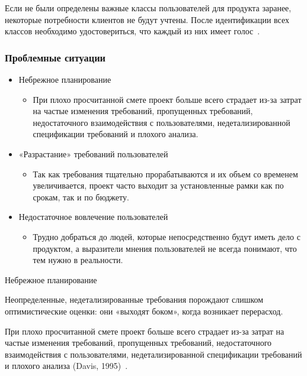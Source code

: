 \documentclass{../industrial-development}
\begin{document}
{Если не были определены важные классы пользователей для продукта заранее, некоторые потребности клиентов не будут учтены.
После идентификации всех классов необходимо удостовериться, что каждый из них имеет голос~\cite[с.~19]{Wiegers}.


\begin{frame} \frametitle {Проблемные ситуации}
\begin{itemize}

\item \alert{Небрежное планирование} 
\begin{itemize}
\item При плохо просчитанной смете проект больше всего страдает из-за затрат на частые изменения требований, пропущенных требований, недостаточного взаимодействия с пользователями, недетализированной спецификации требований и плохого
анализа.
\end{itemize}

\item \alert{«Разрастание» требований пользователей}
\begin{itemize}
\item Так как требования тщательно прорабатываются и их объем со временем увеличивается, проект часто выходит за установленные рамки как по срокам, так и по бюджету. 
\end{itemize}

\item \alert{Недостаточное вовлечение пользователей}
\begin{itemize}
\item  Трудно добраться до
людей, которые непосредственно будут иметь дело с продуктом, а выразители мнения пользователей не всегда понимают, что тем нужно в реальности. 
\end{itemize}

\end{itemize}
\end{frame}

\lecturenotes

\alert{Небрежное планирование}

Неопределенные, недетализированные требования порождают слишком оптимистические оценки: они «выходят боком», когда возникает перерасход.

При плохо просчитанной смете проект больше всего страдает из-за затрат на частые изменения требований, пропущенных требований, недостаточного взаимодействия с пользователями, недетализированной спецификации требований и плохого
анализа (Davis, 1995)~\cite[с.~20]{Wiegers}.

}
\end{document}
